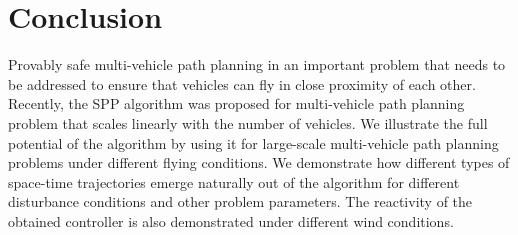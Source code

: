 \section{Conclusion}
Provably safe multi-vehicle path planning in an important problem that needs to be addressed to ensure that vehicles can fly in close proximity of each other. Recently, the SPP algorithm was proposed for multi-vehicle path planning problem that scales linearly with the number of vehicles. We illustrate the full potential of the algorithm by using it for large-scale multi-vehicle path planning problems under different flying conditions. We demonstrate how different types of space-time trajectories emerge naturally out of the algorithm for different disturbance conditions and other problem parameters. The reactivity of the obtained controller is also demonstrated under different wind conditions.